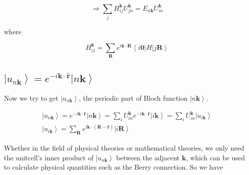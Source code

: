 \documentclass{report}
\begin{document}
\begin{equation}
  \Rightarrow \sum_{j} H_{ij}^{\boldsymbol{k}} U_{jn}^{\boldsymbol{k}} = E_{n\boldsymbol{k}} U_{in}^{\boldsymbol{k}} 
\end{equation}

\noindent
where

\begin{equation}
  H_{ij}^{\boldsymbol{k}} = \sum_{\boldsymbol{R}} e^{i\boldsymbol{k} \cdot \boldsymbol{R}} \left\langle i \boldsymbol{0} \right| H \left| j \boldsymbol{R} \right\rangle
\end{equation}

\subsection{$\left| u_{n\boldsymbol{k}} \right\rangle = e^{-i\boldsymbol{k} \cdot \hat{\boldsymbol{r}}} \left| n\boldsymbol{k} \right\rangle$}

Now we try to get $\left| u_{n\boldsymbol{k}} \right\rangle$, the periodic part of Bloch function $\left| n\boldsymbol{k} \right\rangle$. 

\begin{equation}
  \begin{gathered}
    \left| u_{n\boldsymbol{k}} \right\rangle = e^{-i\boldsymbol{k} \cdot \hat{\boldsymbol{r}}} \left| n\boldsymbol{k} \right\rangle 
      = \sum_{i} U_{in}^{\boldsymbol{k}} e^{-i\boldsymbol{k} \cdot \hat{\boldsymbol{r}}} \left| i\boldsymbol{k} \right\rangle 
      = \sum_{i} U_{in}^{\boldsymbol{k}} \left| u_{i\boldsymbol{k}} \right\rangle \\
    \left| u_{i\boldsymbol{k}} \right\rangle 
      = \sum_{\boldsymbol{R}} e^{i\boldsymbol{k} \cdot (\boldsymbol{R} - \hat{\boldsymbol{r}})} \left| i\boldsymbol{R} \right\rangle 
  \end{gathered}
\end{equation}

Whether in the field of physical theories or mathematical theories, 
we only need the unitcell's inner product of $\left| u_{n\boldsymbol{k}} \right\rangle$ between the adjacent $\boldsymbol{k}$, 
which can be used to calculate physical quantities such as the Berry connection.
So we have
\end{document}

